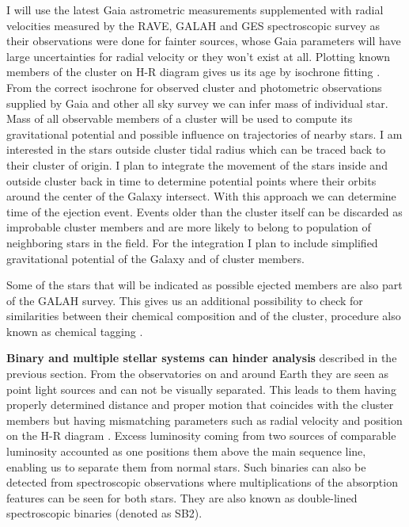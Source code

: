 I will use the latest Gaia astrometric measurements supplemented with radial velocities measured by the RAVE, GALAH and GES spectroscopic survey as their observations were done for fainter sources, whose Gaia parameters will have large uncertainties for radial velocity or they won't exist at all. Plotting known members of the cluster on H-R diagram gives us its age by isochrone fitting \cite{2016ApJ...828...79J}. From the correct isochrone for observed cluster and photometric observations supplied by Gaia and other all sky survey we can infer mass of individual star. Mass of all observable members of a cluster will be used to compute its gravitational potential and possible influence on trajectories of nearby stars. I am interested in the stars outside cluster tidal radius which can be traced back to their cluster of origin. I plan to integrate the movement of the stars inside and outside cluster back in time to determine potential points where their orbits around the center of the Galaxy intersect. With this approach we can determine time of the ejection event. Events older than the cluster itself can be discarded as improbable cluster members and are more likely to belong to population of neighboring stars in the field. For the integration I plan to include simplified gravitational potential of the Galaxy \cite{2014MNRAS.437..351B} and of cluster members. %

Some of the stars that will be indicated as possible ejected members are also part of the GALAH survey. This gives us an additional possibility \cite{2018MNRAS.473.4612K} to check for similarities between their chemical composition and of the cluster, procedure also known as chemical tagging \cite{2002ARA&A..40..487F}.

\textbf{Binary and multiple stellar systems can hinder analysis} described in the previous section. From the observatories on and around Earth they are seen as point light sources and can not be visually separated. This leads to them having properly determined distance and proper motion that coincides with the cluster members but having mismatching parameters such as radial velocity and position on the H-R diagram \cite{2007A&A...473..829M}. Excess luminosity coming from two sources of comparable luminosity accounted as one positions them above the main sequence line, enabling us to separate them from normal stars. Such binaries can also be detected from spectroscopic observations where multiplications of the absorption features can be seen for both stars. They are also known as double-lined spectroscopic binaries (denoted as SB2).

